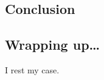 \begin{partChapter}
\chapter{Conclusion}

\ifpdf
    \graphicspath{{colclusion/figures/PNG/}{colclusion/figures/PDF/}{colclusion/figures/}}
\else
    \graphicspath{{colclusion/figures/EPS/}{colclusion/figures/}}
\fi


\section{Wrapping up\ldots}
I rest my case. \lipsum







\end{partChapter}
